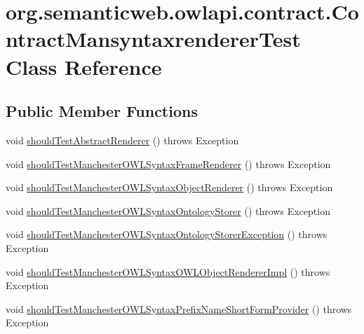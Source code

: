 \hypertarget{classorg_1_1semanticweb_1_1owlapi_1_1contract_1_1_contract_mansyntaxrenderer_test}{\section{org.\-semanticweb.\-owlapi.\-contract.\-Contract\-Mansyntaxrenderer\-Test Class Reference}
\label{classorg_1_1semanticweb_1_1owlapi_1_1contract_1_1_contract_mansyntaxrenderer_test}
}
\subsection*{Public Member Functions}
\begin{DoxyCompactItemize}
\item 
void \hyperlink{classorg_1_1semanticweb_1_1owlapi_1_1contract_1_1_contract_mansyntaxrenderer_test_ad19c77e40056a0aaa3582697ba828375}{should\-Test\-Abstract\-Renderer} ()  throws Exception 
\item 
void \hyperlink{classorg_1_1semanticweb_1_1owlapi_1_1contract_1_1_contract_mansyntaxrenderer_test_ad140314c314c0a0832673c958defd263}{should\-Test\-Manchester\-O\-W\-L\-Syntax\-Frame\-Renderer} ()  throws Exception 
\item 
void \hyperlink{classorg_1_1semanticweb_1_1owlapi_1_1contract_1_1_contract_mansyntaxrenderer_test_ab3a9b2d86100f866b409b859878ded2f}{should\-Test\-Manchester\-O\-W\-L\-Syntax\-Object\-Renderer} ()  throws Exception 
\item 
void \hyperlink{classorg_1_1semanticweb_1_1owlapi_1_1contract_1_1_contract_mansyntaxrenderer_test_ad94b2bc95a2b8e74f775b75081856dfc}{should\-Test\-Manchester\-O\-W\-L\-Syntax\-Ontology\-Storer} ()  throws Exception 
\item 
void \hyperlink{classorg_1_1semanticweb_1_1owlapi_1_1contract_1_1_contract_mansyntaxrenderer_test_a94bc70a0fe99b6f9d268438afe78681b}{should\-Test\-Manchester\-O\-W\-L\-Syntax\-Ontology\-Storer\-Exception} ()  throws Exception 
\item 
void \hyperlink{classorg_1_1semanticweb_1_1owlapi_1_1contract_1_1_contract_mansyntaxrenderer_test_af7d0bca4c9cbab024f3a9816abdd95f8}{should\-Test\-Manchester\-O\-W\-L\-Syntax\-O\-W\-L\-Object\-Renderer\-Impl} ()  throws Exception 
\item 
void \hyperlink{classorg_1_1semanticweb_1_1owlapi_1_1contract_1_1_contract_mansyntaxrenderer_test_ada434f8fcca6662d1e4776cfcac6afcb}{should\-Test\-Manchester\-O\-W\-L\-Syntax\-Prefix\-Name\-Short\-Form\-Provider} ()  throws Exception 

\end{DoxyCompactItemize}
